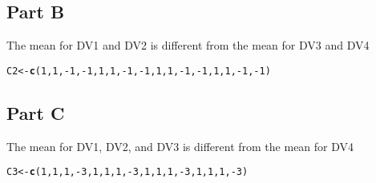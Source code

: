 \documentclass{article}\usepackage[]{graphicx}\usepackage[]{color}
\makeatletter
\newcommand{\hlnum}[1]{\textcolor[rgb]{0.686,0.059,0.569}{#1}}%
\newcommand{\hlopt}[1]{\textcolor[rgb]{0,0,0}{#1}}%
\newcommand{\hlstd}[1]{\textcolor[rgb]{0.345,0.345,0.345}{#1}}%
\newcommand{\hlkwb}[1]{\textcolor[rgb]{0.69,0.353,0.396}{#1}}%
\newcommand{\hlkwd}[1]{\textcolor[rgb]{0.737,0.353,0.396}{\textbf{#1}}}%
\newenvironment{kframe}{%
 \def\at@end@of@kframe{}%
 \ifinner\ifhmode%
  \def\at@end@of@kframe{\end{minipage}}%
  \begin{minipage}{\columnwidth}%
 \fi\fi%
 \def\FrameCommand##1{\hskip\@totalleftmargin \hskip-\fboxsep
 \colorbox{shadecolor}{##1}\hskip-\fboxsep
     \hskip-\linewidth \hskip-\@totalleftmargin \hskip\columnwidth}%
 \MakeFramed {\advance\hsize-\width
   \@totalleftmargin\z@ \linewidth\hsize
   \@setminipage}}%
 {\par\unskip\endMakeFramed%
 \at@end@of@kframe}
\newenvironment{knitrout}{}{} %
\makeatother
\begin{document}
\subsection{Part B}
The mean for DV1 and DV2 is different from the mean for DV3 and DV4 
\begin{knitrout}
\color{fgcolor}\begin{kframe}
\begin{alltt}
\hlstd{C2} \hlkwb{<-} \hlkwd{c}\hlstd{(}\hlnum{1}\hlstd{,}\hlnum{1}\hlstd{,}\hlopt{-}\hlnum{1}\hlstd{,}\hlopt{-}\hlnum{1}\hlstd{,} \hlnum{1}\hlstd{,}\hlnum{1}\hlstd{,}\hlopt{-}\hlnum{1}\hlstd{,}\hlopt{-}\hlnum{1}\hlstd{,} \hlnum{1}\hlstd{,}\hlnum{1}\hlstd{,}\hlopt{-}\hlnum{1}\hlstd{,}\hlopt{-}\hlnum{1}\hlstd{,} \hlnum{1}\hlstd{,}\hlnum{1}\hlstd{,}\hlopt{-}\hlnum{1}\hlstd{,}\hlopt{-}\hlnum{1}\hlstd{)}
\end{alltt}
\end{kframe}
\end{knitrout}

\subsection{Part C}
The mean for DV1, DV2, and DV3 is different from the mean for DV4
\begin{knitrout}
\color{fgcolor}\begin{kframe}
\begin{alltt}
\hlstd{C3} \hlkwb{<-} \hlkwd{c}\hlstd{(}\hlnum{1}\hlstd{,}\hlnum{1}\hlstd{,}\hlnum{1}\hlstd{,}\hlopt{-}\hlnum{3}\hlstd{,} \hlnum{1}\hlstd{,}\hlnum{1}\hlstd{,}\hlnum{1}\hlstd{,}\hlopt{-}\hlnum{3}\hlstd{,} \hlnum{1}\hlstd{,}\hlnum{1}\hlstd{,}\hlnum{1}\hlstd{,}\hlopt{-}\hlnum{3}\hlstd{,} \hlnum{1}\hlstd{,}\hlnum{1}\hlstd{,}\hlnum{1}\hlstd{,}\hlopt{-}\hlnum{3}\hlstd{)}
\end{alltt}
\end{kframe}
\end{knitrout}
\end{document}
